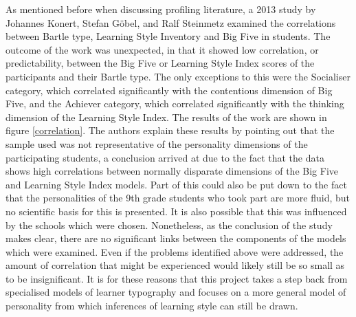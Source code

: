 \documentclass[12pt,a4paper,twoside]{report}
\begin{document}
As mentioned before when discussing profiling literature, a 2013 study by Johannes Konert, Stefan G{\"o}bel, and Ralf Steinmetz \cite{konertmodeling} examined the correlations between Bartle type, Learning Style Inventory and Big Five in students. The outcome of the work was unexpected, in that it showed low correlation, or predictability, between the Big Five or Learning Style Index scores of the participants and their Bartle type. The only exceptions to this were the Socialiser category, which correlated significantly with the contentious dimension of Big Five, and the Achiever category, which correlated significantly with the thinking dimension of the Learning Style Index. The results of the work are shown in figure \ref{correlation}. The authors explain these results by pointing out that the sample used was not representative of the personality dimensions of the participating students, a conclusion arrived at due to the fact that the data shows high correlations between normally disparate dimensions of the Big Five and Learning Style Index models. Part of this could also be put down to the fact that the personalities of the 9th grade students who took part are more fluid, but no scientific basis for this is presented. It is also possible that this was influenced by the schools which were chosen. Nonetheless, as the conclusion of the study makes clear, there are no significant links between the components of the models which were examined. Even if the problems identified above were addressed, the amount of correlation that might be experienced would likely still be so small as to be insignificant. It is for these reasons that this project takes a step back from specialised models of learner typography and focuses on a more general model of personality from which inferences of learning style can still be drawn.
\end{document}
